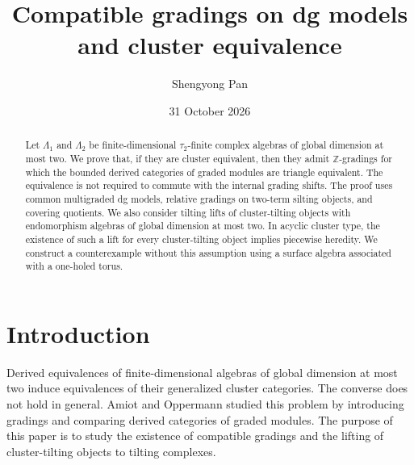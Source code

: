 \documentclass[12pt,a4paper,english,reqno]{amsart}
\theoremstyle{plain}
\theoremstyle{definition}
\numberwithin{equation}{section}
\def\ta{\tau}
\def\La{\Lambda}
\def\bbZ{{\mathbb Z}}
\begin{document}
\title[Compatible gradings and cluster equivalence]{Compatible gradings on dg models and cluster equivalence}
\author{Shengyong Pan}
\address{School of Mathematics and Statistics, Beijing Jiaotong University,
Beijing, 100044, China.}
\address{Beijing Key Laboratory of Biological Big Data and Topological Statistics, Beijing Jiaotong University,
Beijing, 100044, China.}




\date{31 October 2026}
\begin{abstract}
Let $\La_1$ and $\La_2$ be finite-dimensional $\ta_2$-finite complex algebras of global dimension at most two. We prove that, if they are cluster equivalent, then they admit $\bbZ$-gradings for which the bounded derived categories of graded modules are triangle equivalent. The equivalence is not required to commute with the internal grading shifts. The proof uses common multigraded dg models, relative gradings on two-term silting objects, and covering quotients. We also consider tilting lifts of cluster-tilting objects with endomorphism algebras of global dimension at most two. In acyclic cluster type, the existence of such a lift for every cluster-tilting object implies piecewise heredity. We construct a counterexample without this assumption using a surface algebra associated with a one-holed torus.
\end{abstract}
\maketitle
\tableofcontents

\section{Introduction}
Derived equivalences of finite-dimensional algebras of global dimension at most two induce equivalences of their generalized cluster categories. The converse does not hold in general. Amiot and Oppermann studied this problem by introducing gradings and comparing derived categories of graded modules. The purpose of this paper is to study the existence of compatible gradings and the lifting of cluster-tilting objects to tilting complexes.
\end{document}
